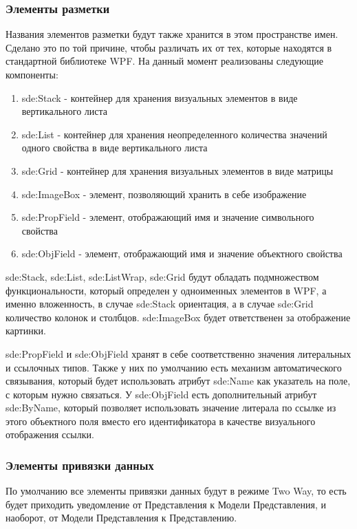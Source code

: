\documentclass[12pt]{article}
\begin{document}
\subsubsection{Элементы разметки}
\qquad Названия элементов разметки будут также хранится в этом пространстве имен. Сделано это по той причине, чтобы различать их от тех, которые находятся в стандартной библиотеке WPF. На данный момент реализованы следующие компоненты:

\begin{enumerate}
    \item sde:Stack - контейнер для хранения визуальных элементов в виде вертикального листа
    \item sde:List - контейнер для хранения неопределенного количества значений одного свойства в виде вертикального листа
    \item sde:Grid - контейнер для хранения визуальных элементов в виде матрицы
    \item sde:ImageBox - элемент, позволяющий хранить в себе изображение
    \item sde:PropField - элемент, отображающий имя и значение символьного свойства
    \item sde:ObjField - элемент, отображающий имя и значение объектного свойства
\end{enumerate}

sde:Stack, sde:List, sde:ListWrap, sde:Grid будут обладать подмножеством функциональности, который определен у одноименных элементов в WPF, а именно вложенность, в случае sde:Stack ориентация, а в случае sde:Grid количество колонок и столбцов. sde:ImageBox будет ответственен за отображение картинки.\par

sde:PropField и sde:ObjField хранят в себе соответственно значения литеральных и ссылочных типов. Также у них по умолчанию есть механизм автоматического связывания, который будет использовать атрибут sde:Name как указатель на поле, с которым нужно связаться. У sde:ObjField есть дополнительный атрибут sde:ByName, который позволяет использовать значение литерала по ссылке из этого объектного поля вместо его идентификатора в качестве визуального отображения ссылки.\par

\subsubsection{Элементы привязки данных}
\qquad По умолчанию все элементы привязки данных будут в режиме Two Way, то есть будет приходить уведомление от Представления к Модели Представления, и наоборот, от Модели Представления к Представлению.\par
\end{document}

